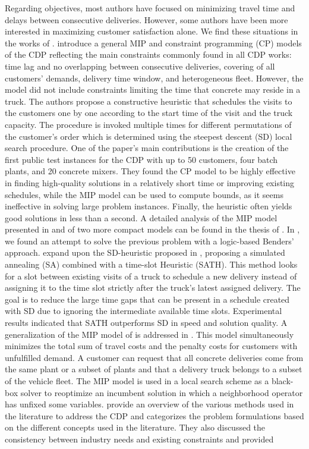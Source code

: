 \documentclass{article}
\begin{document}
Regarding objectives, most authors have focused on minimizing travel time and delays between consecutive deliveries. However, some authors have been more interested in maximizing customer satisfaction alone. We find these situations in the works of \cite{durbin2008or, kinable2014concrete, kinable2014logic, sulaman2017simulated}. \cite{kinable2014concrete} introduce a general MIP and constraint programming (CP) models of the CDP reflecting the main constraints commonly found in all CDP works: time lag and no overlapping between consecutive deliveries, covering of all customers' demands, delivery time window, and heterogeneous fleet. However, the model did not include constraints limiting the time that concrete may reside in a truck. The authors propose a constructive heuristic that schedules the visits to the customers one by one according to the start time of the visit and the truck capacity. The procedure is invoked multiple times for different permutations of the customer's order which is determined using the steepest descent (SD) local search procedure. One of the paper's main contributions is the creation of the first public test instances for the CDP with up to 50 customers, four batch plants, and 20 concrete mixers. They found the CP model to be highly effective in finding high-quality solutions in a relatively short time or improving existing schedules, while the MIP model can be used to compute bounds, as it seems ineffective in solving large problem instances. Finally, the heuristic often yields good solutions in less than a second. A detailed analysis of the MIP model presented in \cite{kinable2014concrete} and of two more compact models can be found in the thesis of \cite{hernandez_lopez_study_2020}. In \cite{kinable2014logic}, we found an attempt to solve the previous problem with a logic-based Benders' approach. \cite{sulaman2017simulated} expand upon the SD-heuristic proposed in \cite{kinable2014concrete}, proposing a simulated annealing (SA) combined with a time-slot Heuristic (SATH). This method looks for a slot between existing visits of a truck to schedule a new delivery instead of assigning it to the time slot strictly after the truck's latest assigned delivery. The goal is to reduce the large time gaps that can be present in a schedule created with SD due to ignoring the intermediate available time slots. Experimental results indicated that SATH outperforms SD in speed and solution quality. A generalization of the MIP model of \cite{kinable2014concrete} is addressed in \cite{asbach2009analysis}. This model simultaneously minimizes the total sum of travel costs and the penalty costs for customers with unfulfilled demand. A customer can request that all concrete deliveries come from the same plant or a subset of plants and that a delivery truck belongs to a subset of the vehicle fleet. The MIP model is used in a local search scheme as a black-box solver to reoptimize an incumbent solution in which a neighborhood operator has unfixed some variables. \cite{tzanetos2023systematic} provide an overview of the various methods used in the literature to address the CDP and categorizes the problem formulations based on the different concepts used in the literature. They also discussed the consistency between industry needs and existing constraints and provided 
\end{document}
